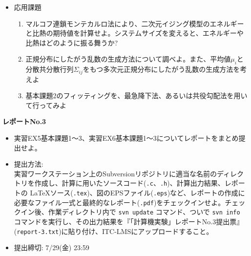 \documentclass[11pt]{jarticle}
\begin{document}
\begin{itemize}
\item 応用課題
  \begin{enumerate}
  \item マルコフ連鎖モンテカルロ法により、二次元イジング模型のエネルギーと比熱の期待値を計算せよ。システムサイズを変えると、エネルギーや比熱はどのように振る舞うか?
  \item 正規分布にしたがう乱数の生成方法について調べよ。また、平均値$\mu_i$と分散共分散行列$\Sigma_{ij}$をもつ多次元正規分布にしたがう乱数の生成方法を考えよ
  \item 基本課題2のフィッティングを、最急降下法、あるいは共役勾配法を用いて行ってみよ
  \end{enumerate}  
\end{itemize}

\noindent
{\bf\large レポートNo.3}
\noindent
\begin{itemize}
\item 実習EX5基本課題1〜3、実習EX6基本課題1〜3についてレポートをまとめ提出せよ。
\item 提出方法: \\
  実習ワークステーション上のSubversionリポジトリに適当な名前のディレクトリを作成し、計算に用いたソースコード({\tt *.c}、{\tt *.h})、計算出力結果、レポートの \LaTeX ソース({\tt *.tex})、図のEPSファイル({\tt *.eps})など、レポートの作成に必要なファイル一式と最終的なレポート({\tt *.pdf})をチェックインせよ。チェックイン後、作業ディレクトリ内で {\tt svn update} コマンド、ついで {\tt svn info} コマンドを実行し、その出力結果を『「計算機実験」レポートNo.3提出票』({\tt report-3.txt})に貼り付け、ITC-LMSにアップロードすること。
\item 提出締切: 7/29(金) 23:59
\end{itemize}
\end{document}
